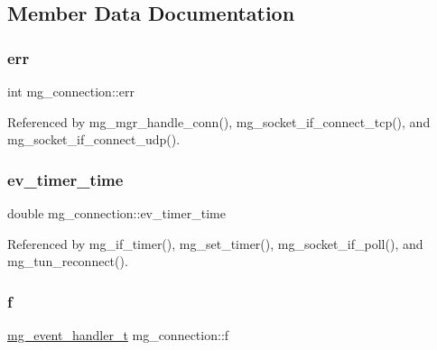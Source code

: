 \subsection{Member Data Documentation}
\mbox{\label{structmg__connection_aa13a0bd4a2ce3d6384866acb7e00344a_aa13a0bd4a2ce3d6384866acb7e00344a}} 
\subsubsection{\texorpdfstring{err}{err}}
{\footnotesize\ttfamily int mg\+\_\+connection\+::err}



Referenced by mg\+\_\+mgr\+\_\+handle\+\_\+conn(), mg\+\_\+socket\+\_\+if\+\_\+connect\+\_\+tcp(), and mg\+\_\+socket\+\_\+if\+\_\+connect\+\_\+udp().

\mbox{\label{structmg__connection_a84d1a7e42f1326c70f61f71e65082dc0_a84d1a7e42f1326c70f61f71e65082dc0}} 
\subsubsection{\texorpdfstring{ev\+\_\+timer\+\_\+time}{ev\_timer\_time}}
{\footnotesize\ttfamily double mg\+\_\+connection\+::ev\+\_\+timer\+\_\+time}



Referenced by mg\+\_\+if\+\_\+timer(), mg\+\_\+set\+\_\+timer(), mg\+\_\+socket\+\_\+if\+\_\+poll(), and mg\+\_\+tun\+\_\+reconnect().

\mbox{\label{structmg__connection_a9bff1f6466b9a610dad5591bdbe79daa_a9bff1f6466b9a610dad5591bdbe79daa}} 
\subsubsection{\texorpdfstring{f}{f}}
{\footnotesize\ttfamily \hyperlink{mongoose_8h_ae5a76da37b3496fcdf561e51648eabda_ae5a76da37b3496fcdf561e51648eabda}{mg\+\_\+event\+\_\+handler\+\_\+t} mg\+\_\+connection\+::f}

